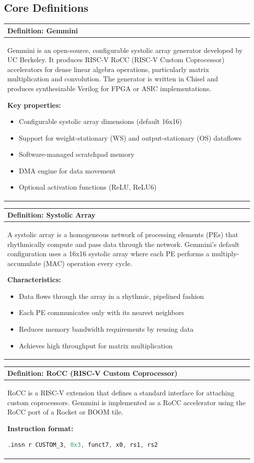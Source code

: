 \documentclass[12pt,a4paper]{article}
\newenvironment{definition}[2][Definition]{
    \begin{center}
    \begin{tabular}{|p{0.95\textwidth}|}
    \hline
    \textbf{#1: #2} \\
    \hline
    \begin{minipage}{0.93\textwidth}
}{
    \end{minipage} \\
    \hline
    \end{tabular}
    \end{center}
}
\begin{document}
\subsection{Core Definitions}

\begin{definition}{Gemmini}
Gemmini is an open-source, configurable systolic array generator developed by UC Berkeley. It produces RISC-V RoCC (RISC-V Custom Coprocessor) accelerators for dense linear algebra operations, particularly matrix multiplication and convolution. The generator is written in Chisel and produces synthesizable Verilog for FPGA or ASIC implementations.

\textbf{Key properties:}
\begin{itemize}[leftmargin=*]
    \item Configurable systolic array dimensions (default 16x16)
    \item Support for weight-stationary (WS) and output-stationary (OS) dataflows
    \item Software-managed scratchpad memory
    \item DMA engine for data movement
    \item Optional activation functions (ReLU, ReLU6)
\end{itemize}
\end{definition}

\begin{definition}{Systolic Array}
A systolic array is a homogeneous network of processing elements (PEs) that rhythmically compute and pass data through the network. Gemmini's default configuration uses a 16x16 systolic array where each PE performs a multiply-accumulate (MAC) operation every cycle.

\textbf{Characteristics:}
\begin{itemize}[leftmargin=*]
    \item Data flows through the array in a rhythmic, pipelined fashion
    \item Each PE communicates only with its nearest neighbors
    \item Reduces memory bandwidth requirements by reusing data
    \item Achieves high throughput for matrix multiplication
\end{itemize}
\end{definition}

\begin{definition}{RoCC (RISC-V Custom Coprocessor)}
RoCC is a RISC-V extension that defines a standard interface for attaching custom coprocessors. Gemmini is implemented as a RoCC accelerator using the RoCC port of a Rocket or BOOM tile.

\textbf{Instruction format:}
\begin{lstlisting}[language=C]
.insn r CUSTOM_3, 0x3, funct7, x0, rs1, rs2
\end{lstlisting}
\end{definition}
\end{document}
